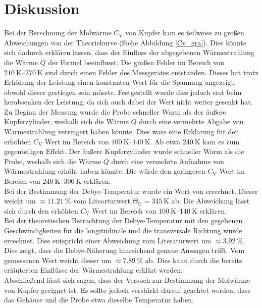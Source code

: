 \section{Diskussion} %
\label{sec:diskussion}

Bei der Berechnung der Molwärme $C_\mathrm{V}$ von Kupfer kam es teilweise zu großen Abweichungen von der Theoriekurve (Siehe Abbildung \ref{Cv_gra}). 
Dies könnte sich dadurch erklären lassen, dass der Einfluss der abgegebenen Wärmestrahlung die Wärme $Q$ der Formel beeinflusst.
Die großen Fehler im Bereich von $\SIrange{210}{270}{\kelvin}$ sind durch einen Fehler des Messgerätes entstanden.
Dieses hat trotz Erhöhung der Leistung einen konstanten Wert für die Spannung angezeigt, obwohl dieser gestiegen sein müsste.
Festgestellt wurde dies jedoch erst beim herabsenken der Leistung, da sich auch dabei der Wert nicht weiter gesenkt hat.\\

Zu Beginn der Messung wurde die Probe schneller Warm als der äußere Kupferzylinder, weshalb sich die Wärme $Q$ durch eine vermehrte Abgabe von Wärmestrahlung verringert haben könnte.
Dies wäre eine Erklärung für den erhöhten $C_\mathrm{V}$ Wert im Bereich von $\SIrange{100}{140}{\kelvin}$.
Ab etwa $\SI{240}{\kelvin}$ kam es zum gegenteiligen Effekt.
Der äußere Kupferzylinder wurde schneller Warm als die Probe, weshalb sich die Wärme $Q$ durch eine vermehrte Aufnahme von Wärmestrahlung erhöht haben könnte.
Die würde den geringeren $C_\mathrm{V}$ Wert im Bereich von $\SIrange{240}{300}{\kelvin}$ erklären.\\

Bei der Bestimmung der Debye-Temperatur wurde ein Wert von  errechnet.
Dieser weicht um $\approx \SI{11.21}{\percent}$ vom Litearturwert $\Theta_\mathrm{D} = \SI{345}{\kelvin}$ \cite{kupfer3} ab.
Die Abweichung lässt sich durch den erhöhten $C_\mathrm{V}$ Wert im Bereich von $\SIrange{100}{140}{\kelvin}$ erklären.\\

Bei der theoretischen Betrachtung der Debye-Temperatur mit den gegebenen Geschwindigkeiten für die longitudinale und die transversale Richtung wurde  errechnet.
Dies entspricht einer Abweichung vom Literaturwert um $\approx \SI{3.92}{\percent}$. 
Dies zeigt, dass die Debye-Näherung hinreichend genaue Aussagen trifft.
Vom gemessenen Wert weicht dieser um $\approx \SI{7.89}{\percent}$ ab.
Dies kann durch die bereits erläuterten Einflüsse der Wärmestrahlung erklärt werden.\\

Abschließend lässt sich sagen, dass der Versuch zur Bestimmung der Molwärme von Kupfer geeignet ist.
Es sollte jedoch verstärkt darauf geachtet werden, dass das Gehäuse und die Probe etwa dieselbe Temperatur haben.
